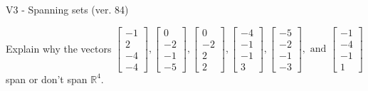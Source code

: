 \begin{exercise}
  \begin{exerciseTitle}V3 - Spanning sets (ver. 84)\end{exerciseTitle}
  \begin{exerciseStatement}
    Explain why the vectors \(\left[\begin{array}{r}
-1 \\
2 \\
-4 \\
-4
\end{array}\right] , \left[\begin{array}{r}
0 \\
-2 \\
-1 \\
-5
\end{array}\right] , \left[\begin{array}{r}
0 \\
-2 \\
2 \\
2
\end{array}\right] , \left[\begin{array}{r}
-4 \\
-1 \\
-1 \\
3
\end{array}\right] , \left[\begin{array}{r}
-5 \\
-2 \\
-1 \\
-3
\end{array}\right] , \text{ and } \left[\begin{array}{r}
-1 \\
-4 \\
-1 \\
1
\end{array}\right]\) span or don't span \(\mathbb{R}^4\). 
	



\end{exerciseStatement}
\end{exercise}
